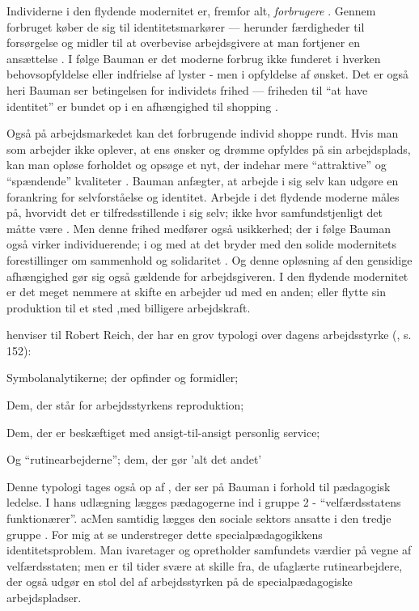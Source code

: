 Individerne i den flydende modernitet er, fremfor alt, \textit{forbrugere} \autocite[s 73ff; s. 76]{baumanLiquidModernity2000}.
Gennem forbruget køber de sig til identitetsmarkører --- herunder færdigheder til forsørgelse og midler til at overbevise arbejdsgivere at man fortjener en ansættelse \autocite[s. 74]{baumanLiquidModernity2000}.
I følge Bauman er det moderne forbrug ikke funderet i hverken behovsopfyldelse eller indfrielse af lyster - men i opfyldelse af ønsket.
Det er også heri Bauman ser betingelsen for individets frihed --- friheden til “at have identitet” er bundet op i en afhængighed til shopping \autocite[s. 84]{baumanLiquidModernity2000}.

Også på arbejdsmarkedet kan det forbrugende individ shoppe rundt.
Hvis man som arbejder ikke oplever, at ens ønsker og drømme opfyldes på sin arbejdsplads, kan man opløse forholdet og opsøge et nyt, der indehar mere “attraktive” og “spændende” kvaliteter \autocite[s. 169]{kofodOrganisationOgLedelse2016}.
Bauman anfægter, at arbejde i sig selv kan udgøre en forankring for selvforståelse og identitet.
Arbejde i det flydende moderne måles på, hvorvidt det er tilfredsstillende i sig selv; ikke hvor samfundstjenligt det måtte være \autocite[s. 139; 163f]{baumanLiquidModernity2000}.
Men denne frihed medfører også usikkerhed; der i følge Bauman også virker individuerende; i og med at det bryder med den solide modernitets forestillinger om sammenhold og solidaritet \autocite[s. 148]{baumanLiquidModernity2000}.
Og denne opløsning af den gensidige afhængighed gør sig også gældende for arbejdsgiveren.
I den flydende modernitet er det meget nemmere at skifte en arbejder ud med en anden; eller flytte sin produktion til et sted ,med billigere arbejdskraft.

\citeauthor{baumanLiquidModernity2000} henviser til Robert Reich, der har en grov typologi over dagens arbejdsstyrke (\citeyear{baumanLiquidModernity2000}, s. 152):

Symbolanalytikerne; der opfinder og formidler;

Dem, der står for arbejdsstyrkens reproduktion;

Dem, der er beskæftiget med ansigt-til-ansigt personlig service;

Og “rutinearbejderne”; dem, der gør 'alt det andet'

Denne typologi tages også op af \citeauthor{kofodOrganisationOgLedelse2016}, der ser på Bauman i forhold til pædagogisk ledelse.
I hans udlægning lægges pædagogerne ind i gruppe 2 - “velfærdsstatens funktionærer”.
acMen samtidig lægges den sociale sektors ansatte i den tredje gruppe \autocite[s. 166]{kofodOrganisationOgLedelse2016}.
For mig at se understreger dette specialpædagogikkens identitetsproblem.
Man ivaretager og opretholder samfundets værdier på vegne af velfærdsstaten; men er til tider svære at skille fra, de ufaglærte rutinearbejdere, der også udgør en stol del af arbejdsstyrken på de specialpædagogiske arbejdspladser. 

